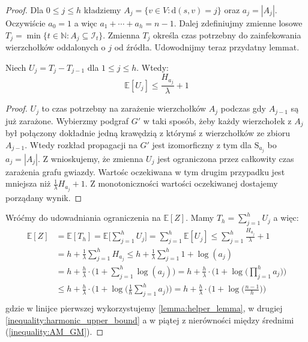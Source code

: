 \begin{proof}
Dla $0\le j \le h$ kładziemy $A_j = \{v \in V : \mathrm{d}(s,v) = j\}$ oraz $a_j= |A_j|$. Oczywiście $a_0=1$ a więc $a_1+\cdots+ a_h = n -1 $. Dalej zdefiniujmy zmienne losowe $T_j = \min\{t\in\mathbb{N} : A_j \subseteq \mathcal{I}_t\}$. Zmienna $T_j$ określa czas potrzebny do zainfekowania wierzchołków oddalonych o $j$ od źródła. Udowodnijmy teraz przydatny lemmat.

\begin{lemma}\label{lemma:helper_lemma}
Niech $U_j = T_j - T_{j-1}$ dla $1 \le j \le h$. Wtedy:
\[
    \mathbb{E}[U_j] \le \frac{H_{a_j}}{\lambda} + 1
\]
\end{lemma}
\begin{proof}
$U_j$ to czas potrzebny na zarażenie wierzchołków $A_j$ podczas gdy $A_{j-1}$ są już zarażone. Wybierzmy podgraf $G'$ w taki sposób, żeby każdy wierzchołek z $A_j$ był połączony dokładnie jedną krawędzią z którymś z wierzchołków ze zbioru $A_{j-1}$. Wtedy rozkład propagacji na $G'$ jest izomorficzny z tym dla $\mathrm{S}_{a_j}$ bo $a_j=|A_j|$. Z  wnioskujemy, że zmienna $U_j$ jest ograniczona przez całkowity czas zarażenia grafu gwiazdy. Wartośc oczekiwana w tym drugim przypadku jest mniejsza niż $\frac{1}{\lambda}H_{a_j} + 1$. Z monotoniczności wartości oczekiwanej dostajemy porządany wynik.
\end{proof}

Wróćmy do udowadniania ograniczenia na $\mathbb{E}[Z]$. Mamy $T_h = \sum_{j=1}^{h} U_j$ a więc:
\begin{equation*}
\begin{aligned}
\mathbb{E}[Z] 
&= \mathbb{E}[T_h] 
  = \mathbb{E}\Big[\sum_{j=1}^{h} U_j\Big] 
  = \sum_{j=1}^{h} \mathbb{E}[U_j] 
  \le \sum_{j=1}^{h} \frac{H_{a_j}}{\lambda} + 1 \\
&= h + \frac{1}{\lambda} \sum_{j=1}^{h} H_{a_j} 
  \le h + \frac{1}{\lambda} \sum_{j=1}^{h} 1 + \log(a_j) \\
&= h + \frac{h}{\lambda} \cdot \Big(1 + \sum_{j=1}^{h} \log(a_j) \Big) = h + \frac{h}{\lambda} \cdot \Big(1 + \log \Big(\prod_{j=1}^{h} a_j\Big)\Big)\\
&\le h + \frac{h}{\lambda} \cdot \Big(1 + \log \Big(\frac{1}{h} \sum_{j=1}^{h} a_j\Big) \Big) = h + \frac{h}{\lambda} \cdot \Big(1 + \log \Big(\frac{n-1}{h}\Big) \Big) \\
\end{aligned}
\end{equation*}
gdzie w linijce pierwszej wykorzystujemy \cref{lemma:helper_lemma}, w drugiej \cref{inequality:harmonic_upper_bound} a w piątej z nierówności między średnimi (\ref{inequality:AM_GM}).
\end{proof}

